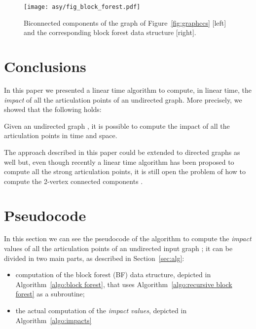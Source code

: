 \documentclass{llncs}
\begin{document}
\begin{figure}[t!]
	\centering {}\hfill 	\texttt{[image: asy/fig\_block\_forest.pdf]}
	\caption{Biconnected components of the graph of Figure~\ref{fig:graphccs} [left] and the corresponding block forest data structure [right].\label{fig:bfds}}
\end{figure}

\section{Conclusions}
\label{sec:conclusions}

In this paper we presented a linear time algorithm to compute, in linear time, the \emph{impact} of all the articulation points of an undirected graph. More precisely, we showed that the following holds:
\begin{theorem}
	Given an undirected graph , it is possible to compute the impact of all the articulation points in  time and space.
\end{theorem}
The approach described in this paper could be extended to directed graphs as well but, even though recently a linear time algorithm has been proposed to compute all the strong articulation points, it is still open the problem of how to compute the 2-vertex connected components \cite{ILS12}.






\vfill 
\iffalse
\pagebreak
\appendix
\section{Pseudocode}

In this section we can see the pseudocode of the algorithm to compute the \emph{impact} values of all the articulation points of an undirected input graph ; it can be divided in two main parts, as described in Section~\ref{sec:alg}: 
\begin{itemize}
\item computation of the block forest (BF) data structure, depicted in Algorithm~\ref{algo:block forest}, that uses Algorithm~\ref{algo:recursive block forest} as a subroutine;
\item the actual computation of the \emph{impact values}, depicted in Algorithm~\ref{algo:impacts}
\end{itemize}


\vfill 
\end{document}
